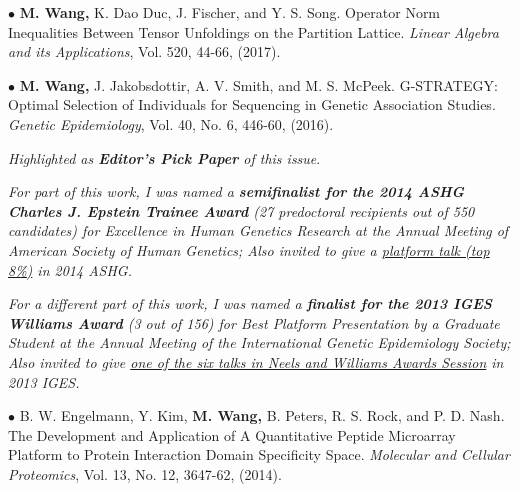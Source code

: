 \documentclass[letterpaper]{article}
\renewenvironment{itemize}{
  \begin{list}{}{
    \setlength{\leftmargin}{1.5em}
  }
}{
  \end{list}
}
\begin{document}
\begin{itemize}
\item$\bullet$ {\bf M. Wang,} K. Dao Duc, J. Fischer, and Y. S. Song. Operator Norm Inequalities Between Tensor Unfoldings on the Partition Lattice. {\it Linear Algebra and its Applications}, Vol. 520, 44-66, (2017).

\item$\bullet$  {\bf M. Wang,} J. Jakobsdottir, A. V. Smith, and M. S. McPeek. G-STRATEGY: Optimal Selection of Individuals for Sequencing in Genetic Association Studies. {\it Genetic Epidemiology}, Vol. 40, No. 6, 446-60, (2016).

\vspace{.1cm}
{\it Highlighted as {\bf Editor's Pick Paper} of this issue}.
\vspace{.1cm}

{\it For part of this work, I was named a {\bf semifinalist for the 2014 ASHG Charles J. Epstein Trainee
Award} (27 predoctoral recipients out of 550 candidates) for Excellence in Human Genetics Research at the Annual Meeting of American Society of Human Genetics; Also invited to give a \underline{platform talk (top 8\%)} in 2014 ASHG.}


{\it For a different part of this work, I was named a {\bf finalist for the 2013 IGES Williams Award} (3 out of 156) for
Best Platform Presentation by a Graduate Student at the Annual Meeting of the International Genetic Epidemiology Society; Also invited to give \underline{one of the six talks in Neels and Williams Awards Session} in 2013 IGES.}


\item$\bullet$  B. W. Engelmann, Y. Kim, {\bf M. Wang,} B. Peters, R. S. Rock, and P. D. Nash. The Development and Application of A Quantitative Peptide Microarray Platform to Protein Interaction Domain Specificity Space. {\it Molecular and Cellular Proteomics}, Vol. 13, No. 12,  3647-62, (2014).
\end{itemize}
\end{document}
